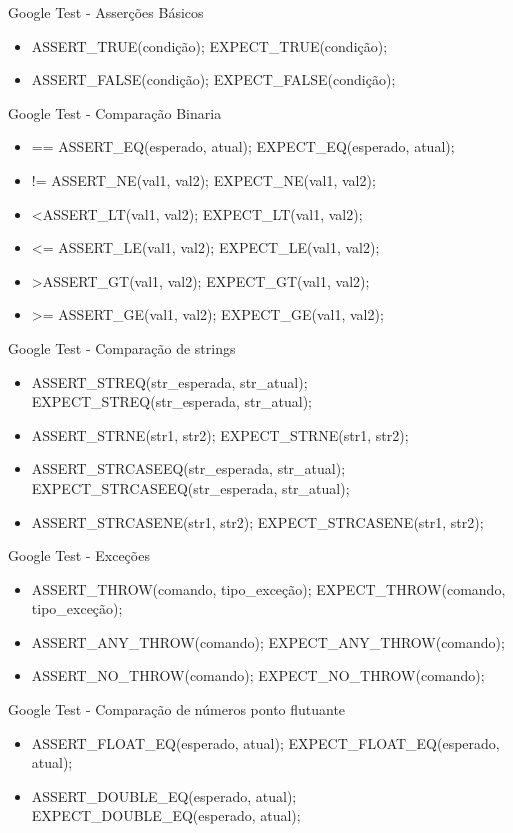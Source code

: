 \documentclass[10pt,a4paper]{beamer}
\begin{document}
	\begin{frame}{Google Test - Asserções}
			Básicos
			\begin{itemize}
				\item ASSERT\_TRUE(condição); 	 EXPECT\_TRUE(condição);
				\item ASSERT\_FALSE(condição); 	EXPECT\_FALSE(condição);	
			\end{itemize}
	\end{frame}  
	\begin{frame}{Google Test - Comparação Binaria}
			\begin{itemize}
				\item == ASSERT\_EQ(esperado, atual);	EXPECT\_EQ(esperado, atual);
				\item != ASSERT\_NE(val1, val2); 	EXPECT\_NE(val1, val2);
				\item \textless ASSERT\_LT(val1, val2); 	EXPECT\_LT(val1, val2);
				\item \textless= ASSERT\_LE(val1, val2); 	EXPECT\_LE(val1, val2);
				\item \textgreater ASSERT\_GT(val1, val2); 	EXPECT\_GT(val1, val2);
				\item \textgreater= ASSERT\_GE(val1, val2); 	EXPECT\_GE(val1, val2); 
			\end{itemize}
	\end{frame}			
	\begin{frame}{Google Test - Comparação de strings}
			\begin{itemize}
				\item ASSERT\_STREQ(str\_esperada, str\_atual); 	 EXPECT\_STREQ(str\_esperada, str\_atual);
				\item ASSERT\_STRNE(str1, str2); 	EXPECT\_STRNE(str1, str2); 
				\item ASSERT\_STRCASEEQ(str\_esperada, str\_atual);	EXPECT\_STRCASEEQ(str\_esperada, str\_atual);
				\item ASSERT\_STRCASENE(str1, str2);	EXPECT\_STRCASENE(str1, str2);
			\end{itemize}
	\end{frame}			
	\begin{frame}{Google Test - Exceções}
			\begin{itemize}
				\item ASSERT\_THROW(comando, tipo\_exceção); 	 EXPECT\_THROW(comando, tipo\_exceção);
				\item ASSERT\_ANY\_THROW(comando); 	EXPECT\_ANY\_THROW(comando);
				\item ASSERT\_NO\_THROW(comando); 	EXPECT\_NO\_THROW(comando); 	
			\end{itemize}
	\end{frame}			
	\begin{frame}{Google Test - Comparação de números ponto flutuante}
			\begin{itemize}
				\item ASSERT\_FLOAT\_EQ(esperado, atual); 	 EXPECT\_FLOAT\_EQ(esperado, atual);
				\item ASSERT\_DOUBLE\_EQ(esperado, atual); 	EXPECT\_DOUBLE\_EQ(esperado, atual); 	
			\end{itemize}
	\end{frame}  
\end{document}
